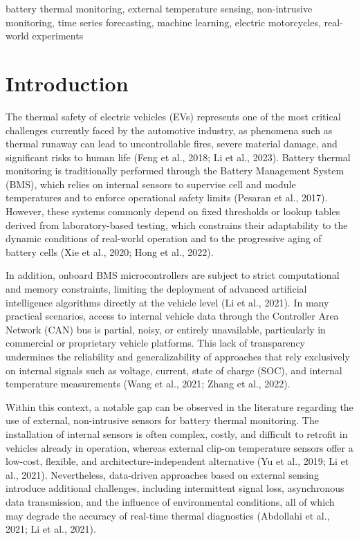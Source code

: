 \documentclass[conference]{IEEEtran}
\begin{document}
\begin{IEEEkeywords}
battery thermal monitoring, external temperature sensing, non-intrusive monitoring, time series forecasting, machine learning, electric motorcycles, real-world experiments
\end{IEEEkeywords}

\section{Introduction}
The thermal safety of electric vehicles (EVs) represents one of the most critical challenges currently faced by the automotive industry, as phenomena such as thermal runaway can lead to uncontrollable fires, severe material damage, and significant risks to human life (Feng et al., 2018; Li et al., 2023). Battery thermal monitoring is traditionally performed through the Battery Management System (BMS), which relies on internal sensors to supervise cell and module temperatures and to enforce operational safety limits (Pesaran et al., 2017). However, these systems commonly depend on fixed thresholds or lookup tables derived from laboratory-based testing, which constrains their adaptability to the dynamic conditions of real-world operation and to the progressive aging of battery cells (Xie et al., 2020; Hong et al., 2022).

In addition, onboard BMS microcontrollers are subject to strict computational and memory constraints, limiting the deployment of advanced artificial intelligence algorithms directly at the vehicle level (Li et al., 2021). In many practical scenarios, access to internal vehicle data through the Controller Area Network (CAN) bus is partial, noisy, or entirely unavailable, particularly in commercial or proprietary vehicle platforms. This lack of transparency undermines the reliability and generalizability of approaches that rely exclusively on internal signals such as voltage, current, state of charge (SOC), and internal temperature measurements (Wang et al., 2021; Zhang et al., 2022).

Within this context, a notable gap can be observed in the literature regarding the use of external, non-intrusive sensors for battery thermal monitoring. The installation of internal sensors is often complex, costly, and difficult to retrofit in vehicles already in operation, whereas external clip-on temperature sensors offer a low-cost, flexible, and architecture-independent alternative (Yu et al., 2019; Li et al., 2021). Nevertheless, data-driven approaches based on external sensing introduce additional challenges, including intermittent signal loss, asynchronous data transmission, and the influence of environmental conditions, all of which may degrade the accuracy of real-time thermal diagnostics (Abdollahi et al., 2021; Li et al., 2021).
\end{document}
